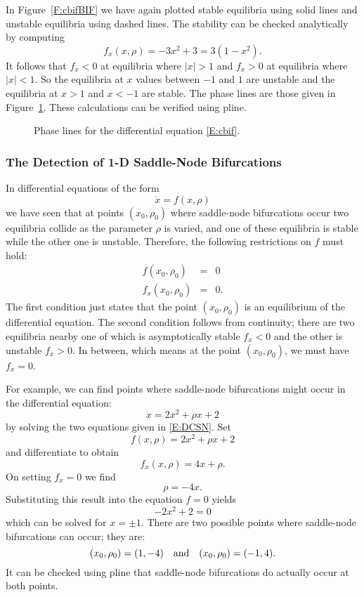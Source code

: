 \documentclass{ximera}
\begin{document}
In Figure~\ref{F:cbifBIF} we have again plotted stable equilibria
 using solid lines and unstable equilibria
 using dashed lines.  The
stability can be checked analytically by computing
\[
f_x(x,\rho) = -3x^2+3 = 3(1-x^2).
\]
It follows that $f_x<0$ at equilibria where $|x|>1$ and $f_x>0$ at 
equilibria where $|x|<1$.  So the equilibria at $x$ values between 
$-1$ and $1$ are unstable and the equilibria at $x>1$ and $x<-1$ are 
stable.  The phase lines are those given in Figure~\ref{F:cbif}.  These 
calculations can be verified using {\sf pline}. 

\vspace{0.4in}

\begin{figure}[htb]
           \centerline{%
           }
           \caption{Phase lines for the differential equation
        \protect\eqref{E:cbif}.}
           \label{F:cbif}
\end{figure}

\subsubsection*{The Detection of 1-D Saddle-Node Bifurcations}

In differential equations of the form
\[
\dot{x} = f(x,\rho)
\]
we have seen that at points $(x_0,\rho_0)$ where saddle-node bifurcations
occur two equilibria collide as the parameter $\rho$ is varied, and one of 
these equilibria is stable while the other one is unstable.  Therefore, the
following restrictions on $f$ must hold:
\begin{equation}  \label{E:DCSN}
\begin{array}{rcl}
f(x_0,\rho_0) & = & 0\\
f_x(x_0,\rho_0) & = & 0.
\end{array}
\end{equation}
The first condition just states that the point $(x_0,\rho_0)$ is an
equilibrium of the differential equation.  The second condition follows from
continuity; there are two equilibria nearby one of which is asymptotically 
stable $f_x<0$ and the other is unstable $f_x>0$.  In between, which means at
the point $(x_0,\rho_0)$, we must have $f_x=0$.

For example, we can find points where saddle-node bifurcations might occur in 
the differential equation:
\[
\dot{x} = 2x^2 +\rho x + 2
\]
by solving the two equations given in \eqref{E:DCSN}.  Set 
\[
f(x,\rho) = 2x^2 +\rho x + 2
\]
and differentiate to obtain
\[
f_x(x,\rho) = 4x + \rho.
\]
On setting $f_x=0$ we find
\[
\rho = -4x.
\]
Substituting this result into the equation $f=0$ yields
\[
-2x^2 + 2 =0
\]
which can be solved for $x=\pm 1$.  There are two possible points where
saddle-node bifurcations can occur; they are:
\[
(x_0,\rho_0) = (1,-4) \quad\mbox{and}\quad  (x_0,\rho_0) = (-1,4).
\]
It can be checked using {\sf pline} that saddle-node bifurcations do actually
occur at both points.
\end{document}
